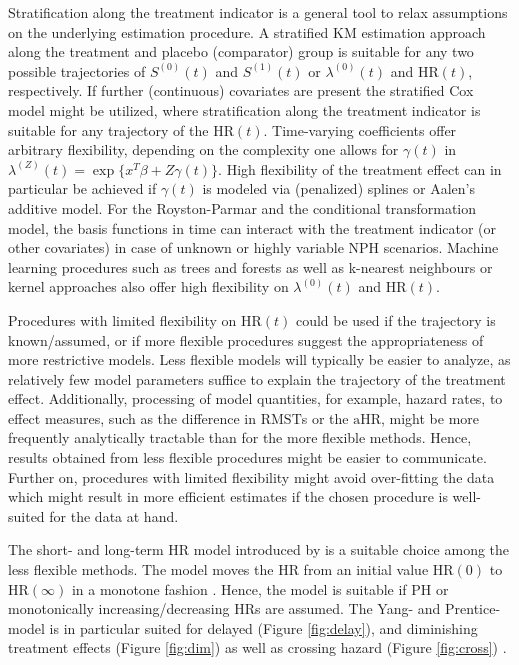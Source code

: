 \documentclass{article}
\begin{document}
\noindent Stratification along the treatment indicator is a general tool to relax assumptions on the underlying estimation procedure. 
A stratified KM estimation approach along the treatment and placebo (comparator) group is suitable for any two possible trajectories of $S^{(0)}(t)$ and $S^{(1)}(t)$ or $\lambda^{(0)}(t)$ and $\text{HR}(t)$, respectively.
If further (continuous) covariates are present the stratified Cox model might be utilized, where stratification along the treatment indicator is suitable for any trajectory of the $\text{HR}(t)$. 
Time-varying coefficients offer arbitrary flexibility, depending on the complexity one allows for $\gamma(t)$ in $\lambda^{(Z)}(t)= \exp\{x^T\beta +Z\gamma(t)\}$. 
High flexibility of the treatment effect can in particular be achieved if $\gamma(t)$ is modeled via (penalized) splines or Aalen's additive model.
For the Royston-Parmar and the conditional transformation model, the basis functions in time can interact with the treatment indicator (or other covariates) in case of unknown or highly variable NPH scenarios.
Machine learning procedures such as trees and forests as well as k-nearest neighbours or kernel approaches also offer high flexibility on $\lambda^{(0)}(t)$ and $\text{HR}(t)$.

\noindent Procedures with limited flexibility on $\text{HR}(t)$ could be used if the trajectory is known/assumed, or if more flexible procedures suggest the appropriateness of more restrictive models.
Less flexible models will typically be easier to analyze, as relatively few model parameters suffice to explain the trajectory of the treatment effect.
Additionally, processing of model quantities, for example, hazard rates, to effect measures, such as the difference in $\text{RMST}$s or the $\text{aHR}$, might be more frequently analytically tractable than for the more flexible methods.
Hence, results obtained from less flexible procedures might be easier to communicate.
Further on, procedures with limited flexibility might avoid over-fitting the data which might result in more efficient estimates if the chosen procedure is well-suited for the data at hand.

\noindent The short- and long-term HR model introduced by \cite{Yang.2005} is a suitable choice among the less flexible methods.
The model moves the HR from an initial value $\text{HR}(0)$ to $\text{HR}(\infty)$ in a monotone fashion \cite{Yang.2010}.
Hence, the model is suitable if PH or monotonically increasing/decreasing HRs are assumed.
The Yang- and Prentice-model is in particular suited for delayed (Figure \ref{fig:delay}), and diminishing treatment effects (Figure \ref{fig:dim}) as well as crossing hazard (Figure \ref{fig:cross}) \cite{Yang.2010}.
\end{document}
